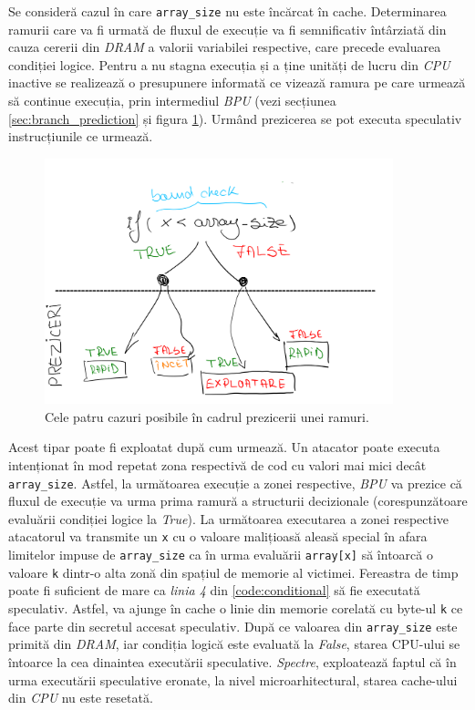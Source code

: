 Se consideră cazul în care \texttt{array\_size} nu este încărcat în cache.
Determinarea ramurii care va fi urmată de fluxul de execuție va fi semnificativ
întârziată din cauza cererii din \emph{DRAM} a valorii variabilei respective,
care precede evaluarea condiției logice. Pentru a nu stagna execuția și a ține
unități de lucru din \emph{CPU} inactive se realizează o presupunere informată ce
vizează ramura pe care urmează să continue execuția, prin intermediul \emph{BPU}
(vezi secțiunea \ref{sec:branch_prediction} și figura
\ref{fig:branch_prediction}). Urmând prezicerea se pot executa speculativ
instrucțiunile ce urmează.

\begin{figure}[ht]
	\centering
	\includegraphics[width=0.9\textwidth]{images/branch_pred.png}
	\caption{Cele patru cazuri posibile în cadrul prezicerii unei ramuri.}
  \label{fig:branch_prediction}
\end{figure}

Acest tipar poate fi exploatat după cum urmează. Un atacator poate executa
intenționat în mod repetat zona respectivă de cod cu valori mai mici decât
\texttt{array\_size}. Astfel, la următoarea execuție a zonei respective,
\emph{BPU} va prezice că fluxul de execuție va urma prima ramură a structurii
decizionale (corespunzătoare evaluării condiției logice la \emph{True}). La
următoarea executarea a zonei respective atacatorul va transmite un \texttt{x}
cu o valoare malițioasă aleasă special în afara limitelor impuse de
\texttt{array\_size} ca în urma evaluării \texttt{array[x]} să întoarcă o
valoare \texttt{k} dintr-o alta zonă din spațiul de memorie al victimei.
Fereastra de timp poate fi suficient de mare ca \emph{linia 4} din
\ref{code:conditional} să fie executată speculativ. Astfel, va ajunge în cache
o linie din memorie corelată cu byte-ul \texttt{k} ce face parte din secretul
accesat speculativ. După ce valoarea din \texttt{array\_size} este primită din
\emph{DRAM}, iar condiția logică este evaluată la \emph{False}, starea CPU-ului
se întoarce la cea dinaintea executării speculative. \emph{Spectre},
exploatează faptul că în urma executării speculative eronate, la nivel
microarhitectural, starea cache-ului din \emph{CPU} nu este resetată.

